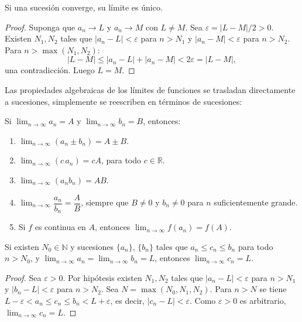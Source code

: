 \begin{theorem}
Si una sucesión converge, su límite es único.
\end{theorem}

\begin{proof}
Suponga que $a_n \to L$ y $a_n \to M$ con $L \neq M$. Sea $\varepsilon = |L - M|/2 > 0$.
Existen $N_1, N_2$ tales que $|a_n - L| < \varepsilon$ para $n > N_1$ y
$|a_n - M| < \varepsilon$ para $n > N_2$. Para $n > \max(N_1, N_2)$:
\[
    |L - M| \leq |a_n - L| + |a_n - M| < 2\varepsilon = |L - M|,
\]
una contradicción. Luego $L = M$.
\end{proof}

Las propiedades algebraicas de los límites de funciones se trasladan directamente a sucesiones, simplemente se reescriben en términos de sucesiones:

\begin{theorem}
Si $\lim_{n \to \infty} a_n = A$ y $\lim_{n \to \infty} b_n = B$, entonces:
\begin{enumerate}
  \item $\lim_{n \to \infty} (a_n \pm b_n) = A \pm B$.
  \item $\lim_{n \to \infty} (c\,a_n) = cA$, para todo $c \in \mathbb{R}$.
  \item $\lim_{n \to \infty} (a_n b_n) = AB$.
  \item $\lim_{n \to \infty} \dfrac{a_n}{b_n} = \dfrac{A}{B}$, siempre que
        $B \neq 0$ y $b_n \neq 0$ para $n$ suficientemente grande.
  \item Si $f$ es continua en $A$, entonces $\lim_{n \to \infty} f(a_n)
        = f(A)$.
\end{enumerate}
\end{theorem}

\begin{theorem}
Si existen $N_0 \in \mathbb{N}$ y sucesiones $\{a_n\}$, $\{b_n\}$ tales que
$a_n \leq c_n \leq b_n$ para todo $n > N_0$, y
$\lim_{n \to \infty} a_n = \lim_{n \to \infty} b_n = L$, entonces
$\lim_{n \to \infty} c_n = L$.
\end{theorem}

\begin{proof}
Sea $\varepsilon>0$. Por hipótesis existen $N_1,N_2$ tales que
$|a_n-L|<\varepsilon$ para $n>N_1$ y $|b_n-L|<\varepsilon$ para $n>N_2$. Sea
$N=\max(N_0,N_1,N_2)$. Para $n>N$ se tiene
$L-\varepsilon<a_n\leq c_n\leq b_n<L+\varepsilon$, es decir,
$|c_n-L|<\varepsilon$. Como $\varepsilon>0$ es arbitrario,
$\lim_{n\to\infty}c_n=L$.
\end{proof}

